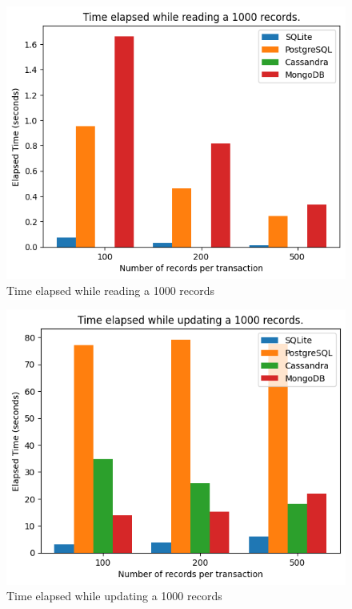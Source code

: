 \begin{figure}[htbp]
 \centering
 \includegraphics[width=1\textwidth]{gfx/read}
 \caption{Time elapsed while reading a 1000 records}
\end{figure}
\begin{figure}[htbp]
 \centering
 \includegraphics[width=1\textwidth]{gfx/update}
 \caption{Time elapsed while updating a 1000 records}
\end{figure}
